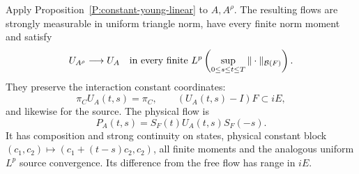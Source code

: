\begin{proposition}
  \label{P:constant-gaussian-flow}
  Apply Proposition~\ref{P:constant-young-linear} to $A,A^\rho$.
  The resulting flows are strongly measurable in uniform triangle norm,
  have every finite norm moment and satisfy
  \begin{equation}\label{E:constant-flow-limit}
    U_{A^\rho}\longrightarrow U_A
    \quad\hbox{in every finite }L^p
    \left(\sup_{0\le s\le t\le T}\|\cdot\|_{\mathcal B(F)}\right).
  \end{equation}
  They preserve the interaction constant coordinates:
  \begin{equation}\label{E:constant-flow-range}
    \pi_CU_A(t,s)=\pi_C,\qquad
    (U_A(t,s)-I)F\subset iE,
  \end{equation}
  and likewise for the source. The physical flow is
  \begin{equation}\label{E:constant-physical-flow}
    P_A(t,s)=S_F(t)U_A(t,s)S_F(-s).
  \end{equation}
  It has composition and strong continuity on states, physical constant
  block $(c_1,c_2)\mapsto(c_1+(t-s)c_2,c_2)$, all finite moments
  and the analogous uniform $L^p$ source convergence.
  Its difference from the free flow has range in $iE$.
\end{proposition}

